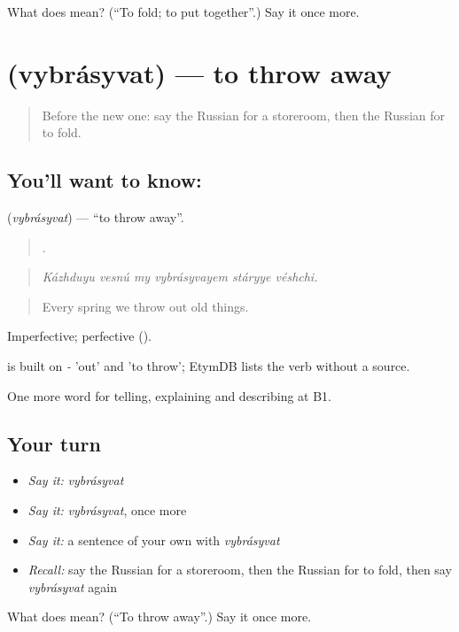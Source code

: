 \begin{tcolorbox}[breakable,colback=teal!4,colframe=teal!35!black,title={Before you move on}]
What does  mean? (\textquotedblleft{}To fold; to put together\textquotedblright{}.) Say it once more.
\end{tcolorbox}
\section[\texorpdfstring{\ru{выбрасывать} (vybrásyvat)}{выбрасывать (vybrásyvat)}]{ (vybrásyvat) — to throw away}

\label{lesson:RU-C531-vybrasyvat}



\begin{quote}
Before the new one: say the Russian for a storeroom, then the Russian for to fold.
\end{quote}

\subsection*{You'll want to know: }
\textbf{} (\emph{vybrásyvat}) — \textquotedblleft{}to throw away\textquotedblright{}.

\begin{quote}
     .
\end{quote}

\begin{quote}
\emph{Kázhduyu vesnú my vybrásyvayem stáryye véshchi.}
\end{quote}

\begin{quote}
Every spring we throw out old things.
\end{quote}

Imperfective; perfective  ().

\begin{cousinweb}
\emph{} is built on \emph{-} 'out' and \emph{} 'to throw'; EtymDB lists the verb without a source.
\end{cousinweb}

\begin{grammarlens}[title={What you've built}]
One more word for telling, explaining and describing at B1.
\end{grammarlens}

\subsection*{Your turn}
\begin{itemize}
\raggedright
  \item \emph{Say it:} \emph{vybrásyvat}
  \item \emph{Say it:} \emph{vybrásyvat}, once more
  \item \emph{Say it:} a sentence of your own with \emph{vybrásyvat}
  \item \emph{Recall:} say the Russian for a storeroom, then the Russian for to fold, then say \emph{vybrásyvat} again
\end{itemize}

\begin{tcolorbox}[breakable,colback=teal!4,colframe=teal!35!black,title={Before you move on}]
What does  mean? (\textquotedblleft{}To throw away\textquotedblright{}.) Say it once more.
\end{tcolorbox}
